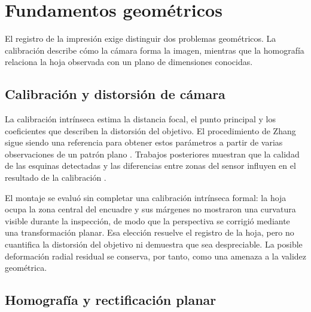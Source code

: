 
\section{Fundamentos geométricos}

El registro de la impresión exige distinguir dos problemas geométricos. La calibración describe cómo la cámara forma la imagen, mientras que la homografía relaciona la hoja observada con un plano de dimensiones conocidas.

\subsection{Calibración y distorsión de cámara}

La calibración intrínseca estima la distancia focal, el punto principal y los coeficientes que describen la distorsión del objetivo. El procedimiento de Zhang sigue siendo una referencia para obtener estos parámetros a partir de varias observaciones de un patrón plano \cite{Zhang2000}. Trabajos posteriores muestran que la calidad de las esquinas detectadas y las diferencias entre zonas del sensor influyen en el resultado de la calibración \cite{Wang2022}.

El montaje se evaluó sin completar una calibración intrínseca formal: la hoja ocupa la zona central del encuadre y sus márgenes no mostraron una curvatura visible durante la inspección, de modo que la perspectiva se corrigió mediante una transformación planar. Esa elección resuelve el registro de la hoja, pero no cuantifica la distorsión del objetivo ni demuestra que sea despreciable. La posible deformación radial residual se conserva, por tanto, como una amenaza a la validez geométrica.

\subsection{Homografía y rectificación planar}

